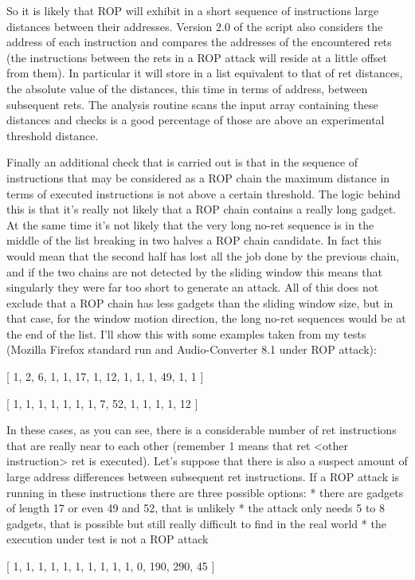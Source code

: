 \documentclass[Lau,binding=0.6cm]{sapthesis}
\begin{document}
So it is likely that ROP will exhibit in a short sequence of instructions large distances between their addresses. 
Version 2.0 of the script also considers the address of each instruction and compares the addresses of the encountered rets (the instructions between the rets in a ROP attack will reside at a little offset from them). In particular it will store in a list equivalent to that of ret distances, the absolute value of the distances, this time in terms of address, between subsequent rets. The analysis routine scans the input array containing these distances and checks is a good percentage of those are above an experimental threshold distance.


Finally an additional check that is carried out is that in the sequence of instructions that may be considered as a ROP chain the maximum distance in terms of executed instructions is not above a certain threshold. The logic behind this is that it’s really not likely that a ROP chain contains a really long gadget. At the same time it’s not likely that the very long no-ret sequence is in the middle of the list breaking in two halves a ROP chain candidate. In fact this would mean that the second half has lost all the job done by the previous chain, and if the two chains are not detected by the sliding window this means that singularly they were far too short to generate an attack. All of this does not exclude that a ROP chain has less gadgets than the sliding window size, but in that case, for the window motion direction, the long no-ret sequences would be at the end of the list.
I’ll show this with some examples taken from my tests (Mozilla Firefox standard run and Audio-Converter 8.1 under ROP attack):


[ 1, 2, 6, 1, 1, 17, 1, 12, 1, 1, 1, 49, 1, 1 ]


[ 1, 1, 1, 1, 1, 1, 1, 7, 52, 1, 1, 1, 1, 12 ]


In these cases, as you can see, there is a considerable number of ret instructions that are really near to each other (remember 1 means that ret <other instruction> ret is executed). Let’s suppose that there is also a suspect amount of large address differences between subsequent ret instructions. If a ROP attack is running in these instructions there are three possible options:
* there are gadgets of length 17 or even 49 and 52, that is unlikely
* the attack only needs 5 to 8 gadgets, that is possible but still really difficult to find in the real world
* the execution under test is not a ROP attack


[ 1, 1, 1, 1, 1, 1, 1, 1, 1, 1, 0, 190, 290, 45 ]
\end{document}
